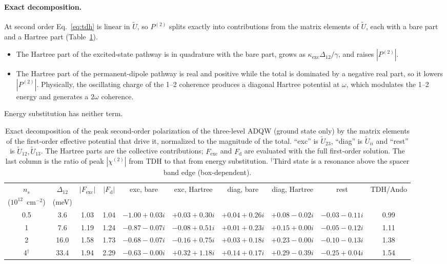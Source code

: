 \documentclass[11pt]{article}
\newcommand{\chitwo}{\chi^{(2)}}
\begin{document}
\paragraph{Exact decomposition.} At second order Eq.~\eqref{eq:tdh} is linear in $\tilde U$, so $P^{(2)}$ splits exactly into contributions from the matrix elements of $\tilde U$, each with a bare part and a Hartree part (Table~\ref{tab:decomp}).
\begin{itemize}
\item The Hartree part of the excited-state pathway is in quadrature with the bare part, grows as $\kappa_\mathrm{exc}\Delta_{12}/\gamma$, and raises $|P^{(2)}|$.
\item The Hartree part of the permanent-dipole pathway is real and positive while the total is dominated by a negative real part, so it lowers $|P^{(2)}|$. Physically, the oscillating charge of the 1--2 coherence produces a diagonal Hartree potential at $\omega$, which modulates the 1--2 energy and generates a $2\omega$ coherence.
\end{itemize}
Energy substitution has neither term.

\begin{table}[!t]\centering\small
\caption{Exact decomposition of the peak second-order polarization of the three-level ADQW (ground state only) by the matrix elements of the first-order effective potential that drive it, normalized to the magnitude of the total. ``exc'' is $\tilde U_{23}$, ``diag'' is $\tilde U_{ii}$ and ``rest'' is $\tilde U_{12},\tilde U_{13}$. The Hartree parts are the collective contributions; $F_\mathrm{exc}$ and $F_\mathrm{d}$ are evaluated with the full first-order solution. The last column is the ratio of peak $|\chitwo|$ from TDH to that from energy substitution. $^\dagger$Third state is a resonance above the spacer band edge (box-dependent).}
\label{tab:decomp}
\setlength{\tabcolsep}{2.5pt}\footnotesize
\begin{tabular}{cccccccccc}
\toprule
$n_s$ & $\Delta_{12}$ & $|F_\mathrm{exc}|$ & $|F_\mathrm{d}|$ & exc, bare & exc, Hartree & diag, bare & diag, Hartree & rest & TDH/Ando\\
($10^{12}$~cm$^{-2}$) & (meV) & & & & & & & & \\
\midrule
0.5 & 3.6 & 1.03 & 1.04 & $-1.00+0.03i$ & $+0.03+0.30i$ & $+0.04+0.26i$ & $+0.08-0.02i$ & $-0.03-0.11i$ & 0.99\\
1 & 7.6 & 1.19 & 1.24 & $-0.87-0.07i$ & $-0.08+0.51i$ & $+0.01+0.23i$ & $+0.15+0.00i$ & $-0.05-0.12i$ & 1.11\\
2 & 16.0 & 1.58 & 1.73 & $-0.68-0.07i$ & $-0.16+0.75i$ & $+0.03+0.18i$ & $+0.23-0.00i$ & $-0.10-0.13i$ & 1.38\\
4$^\dagger$ & 33.4 & 1.94 & 2.29 & $-0.63-0.00i$ & $+0.32+1.18i$ & $+0.14+0.17i$ & $+0.29-0.39i$ & $-0.25+0.04i$ & 1.54\\
\bottomrule
\end{tabular}
\end{table}
\end{document}
